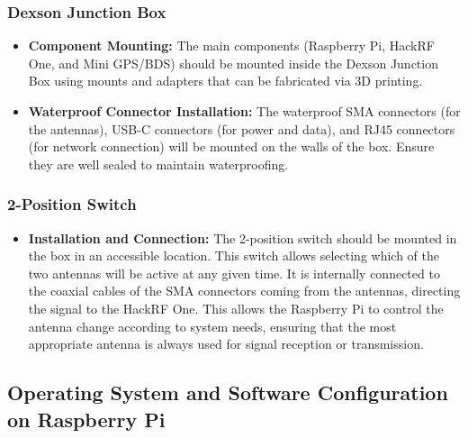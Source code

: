 \documentclass{article}
\begin{document}
\subsubsection{Dexson Junction Box}
\begin{itemize}
    \item \textbf{Component Mounting:} The main components (Raspberry Pi, HackRF One, and Mini GPS/BDS) should be mounted inside the Dexson Junction Box using mounts and adapters that can be fabricated via 3D printing.
    \item \textbf{Waterproof Connector Installation:} The waterproof SMA connectors (for the antennas), USB-C connectors (for power and data), and RJ45 connectors (for network connection) will be mounted on the walls of the box. Ensure they are well sealed to maintain waterproofing.
\end{itemize}

\subsubsection{2-Position Switch}
\begin{itemize}
    \item \textbf{Installation and Connection:} The 2-position switch should be mounted in the box in an accessible location. This switch allows selecting which of the two antennas will be active at any given time. It is internally connected to the coaxial cables of the SMA connectors coming from the antennas, directing the signal to the HackRF One. This allows the Raspberry Pi to control the antenna change according to system needs, ensuring that the most appropriate antenna is always used for signal reception or transmission.
\end{itemize}

\subsection{Operating System and Software Configuration on Raspberry Pi}
\end{document}
